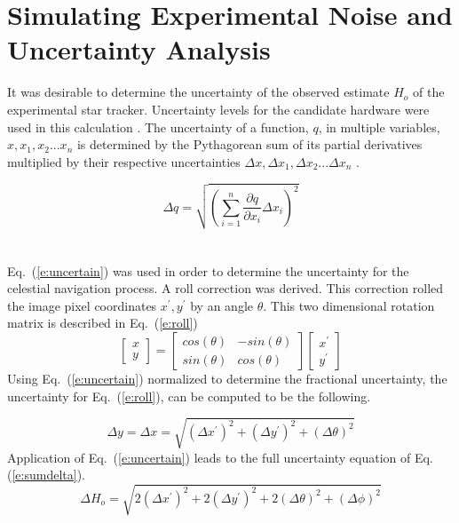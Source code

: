 \documentclass[12pt,a4paper]{book}
\begin{document}
\section{Simulating Experimental Noise and Uncertainty Analysis}
It was desirable to determine the uncertainty of the observed estimate $H_{o}$ of the experimental star tracker.  Uncertainty levels for the candidate hardware were used in this calculation  \cite{b:imu}.  The uncertainty of a function, $q$, in multiple variables, $x, x_{1}, x_{2} ... x_{n}$ is determined by the Pythagorean sum of its partial derivatives multiplied by their respective uncertainties $\Delta x, \Delta x_{1}, \Delta x_{2} ... \Delta x_{n}$ \cite{b:uncertainty}.  

\begin{equation}
    \label{e:uncertain}
\Delta q = \sqrt{\left(\sum\limits_{i=1}^n  \frac{\partial q}{\partial x_{i}}\Delta x_{i} \right)^{2} }
\end{equation}
\\\\
Eq.~(\ref{e:uncertain}) was used in order to determine the uncertainty for the celestial navigation process.  A roll correction was derived.  This correction rolled the image pixel coordinates $x^{'}, y^{'}$ by an angle $\theta$.  This two dimensional rotation matrix is described in Eq.~(\ref{e:roll})
\begin{equation}
    \label{e:roll}
   \begin{bmatrix} 
  x     \\ 
  y 
\end{bmatrix}=\begin{bmatrix} 
  cos(\theta)     & -sin(\theta)\\ 
  sin(\theta) & cos(\theta) 
\end{bmatrix}\begin{bmatrix} 
  x^{'}\\ 
  y^{'} 
\end{bmatrix}
\end{equation}
Using Eq.~(\ref{e:uncertain}) normalized to determine the fractional uncertainty, the uncertainty for Eq.~(\ref{e:roll}), can be computed to be the following. 

\begin{equation}
\Delta y = \Delta x = \sqrt{\left(\Delta x^{'}\right)^{2} + \left(\Delta y^{'}\right)^{2} + \left(\Delta \theta\right)^{2}}
\end{equation}
Application of Eq.~(\ref{e:uncertain}) leads to the full uncertainty equation of Eq.(\ref{e:sumdelta}).
\begin{equation}
    \label{e:sumdelta}
\Delta H_{o} = \sqrt{ 2\left(\Delta x^{'}\right)^{2} + 2\left(\Delta y^{'}\right)^{2} +2\left(\Delta \theta\right)^{2} +\left(\Delta \phi\right)^{2}   }
\end{equation}
\end{document}
